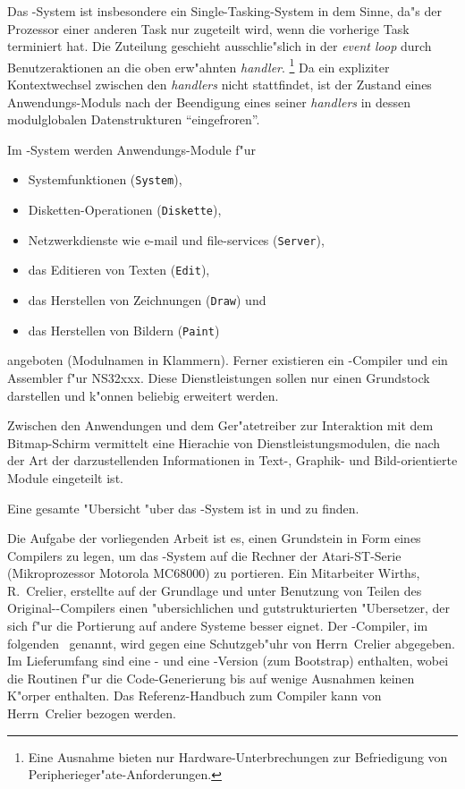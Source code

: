 Das \oberon-System ist insbesondere ein Single-Tasking-System in dem Sinne, da"s
der Prozessor einer anderen Task nur zugeteilt wird, wenn die vorherige Task
terminiert hat.
Die Zuteilung geschieht ausschlie"slich in der {\it event loop\/} durch Benutzeraktionen
an die oben erw"ahnten {\it handler}.%
\footnote{Eine Ausnahme bieten nur Hardware-Unterbrechungen zur Befriedigung
von Peripherieger"ate-Anforderungen.}
Da ein expliziter Kontextwechsel zwischen den {\it handlers\/} nicht stattfindet,
ist der Zustand eines Anwendungs-Moduls nach der Beendigung eines seiner
{\it handlers\/} in dessen modulglobalen Datenstrukturen "`eingefroren"'.

Im \oberon-System werden Anwendungs-Module f"ur
\begin{itemize}
\item Systemfunktionen ({\tt System}),
\item Disketten-Operationen ({\tt Diskette}),
\item Netzwerkdienste wie e-mail und file-services ({\tt Server}),
\item das Editieren von Texten ({\tt Edit}),
\item das Herstellen von Zeichnungen ({\tt Draw}) und
\item das Herstellen von Bildern ({\tt Paint})
\end{itemize}
angeboten (Modulnamen in Klammern).
Ferner existieren ein \oberon-Compiler und ein Assembler f"ur NS32xxx.
Diese Dienstleistungen sollen nur einen Grundstock darstellen und k"onnen
beliebig erweitert werden.

Zwischen den Anwendungen und dem Ger"atetreiber zur Interaktion mit dem
Bitmap-Schirm vermittelt eine Hierachie von Dienstleistungsmodulen, die
nach der Art der darzustellenden Informationen in Text-, Graphik- und
Bild-orientierte Module eingeteilt ist.

Eine gesamte "Ubersicht "uber das \oberon-System ist in \cite{oberonSystem}
und \cite{oberonGuide} zu finden.

\medskip
Die Aufgabe der vorliegenden Arbeit ist es, einen Grundstein in Form eines Compilers
zu legen, um das \oberon-System auf die Rechner der Atari-ST-Serie
(Mikroprozessor Motorola MC68000) zu portieren.
Ein Mitarbeiter Wirths, R.~Crelier, erstellte auf der Grundlage und unter Benutzung
von Teilen des Original-\oberon-Compilers einen "ubersichlichen und
gutstrukturierten "Ubersetzer, der sich f"ur die Portierung auf andere Systeme
besser eignet.
Der \oberon-Compiler, im folgenden \OP\ genannt, wird gegen eine Schutzgeb"uhr
von Herrn~Crelier abgegeben.
Im Lieferumfang sind eine \oberon- und eine \modula-Version (zum Bootstrap)
enthalten, wobei die Routinen f"ur die Code-Generierung bis auf wenige
Ausnahmen keinen K"orper enthalten.
Das Referenz-Handbuch zum Compiler kann von Herrn~Crelier bezogen werden.\cite{op2doc}

